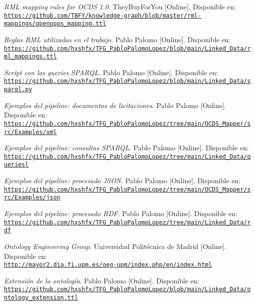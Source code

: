 \begin{thebibliography}{X}
            \textit{RML mapping rules for OCDS 1.0}. TheyBuyForYou [Online]. Disponible en:
            \\ \texttt{\url{https://github.com/TBFY/knowledge-graph/blob/master/rml-mappings/openopps_mapping.ttl}}
            
    		\textit{Reglas RML utilizadas en el trabajo}. Pablo Palomo [Online]. Disponible en:
            \\ \texttt{\url{https://github.com/hxshfx/TFG_PabloPalomoLopez/blob/main/Linked_Data/rml_mappings.ttl}}
        
      		\textit{Script con las queries SPARQL}. Pablo Palomo [Online]. Disponible en:
            \\ \texttt{\url{https://github.com/hxshfx/TFG_PabloPalomoLopez/blob/main/Linked_Data/sparql.py}}
        
            \textit{Ejemplos del pipeline: documentos de licitaciones}. Pablo Palomo [Online]. Disponible en:
            \\ \texttt{\url{https://github.com/hxshfx/TFG_PabloPalomoLopez/tree/main/OCDS_Mapper/src/Examples/xml}}
            
            \textit{Ejemplos del pipeline: consultas SPARQL}. Pablo Palomo [Online]. Disponible en:
            \\ \texttt{\url{https://github.com/hxshfx/TFG_PabloPalomoLopez/tree/main/Linked_Data/queriesl}}
            
            \textit{Ejemplos del pipeline: procesado JSON}. Pablo Palomo [Online]. Disponible en:
            \\ \texttt{\url{https://github.com/hxshfx/TFG_PabloPalomoLopez/tree/main/OCDS_Mapper/src/Examples/json}}
            
  			 \textit{Ejemplos del pipeline: procesado RDF}. Pablo Palomo [Online]. Disponible en:
            \\ \texttt{\url{https://github.com/hxshfx/TFG_PabloPalomoLopez/tree/main/Linked_Data/rdf}}
            
            \textit{Ontology Engineering Group}. Universidad Politécnica de Madrid [Online]. Disponible en:
            \\ \texttt{\url{http://mayor2.dia.fi.upm.es/oeg-upm/index.php/en/index.html}}
            
            \textit{Extensión de la ontología}. Pablo Palomo [Online]. Disponible en:
            \\ \texttt{\url{https://github.com/hxshfx/TFG_PabloPalomoLopez/blob/main/Linked_Data/ontology_extension.ttl}}    
        

\end{thebibliography}
